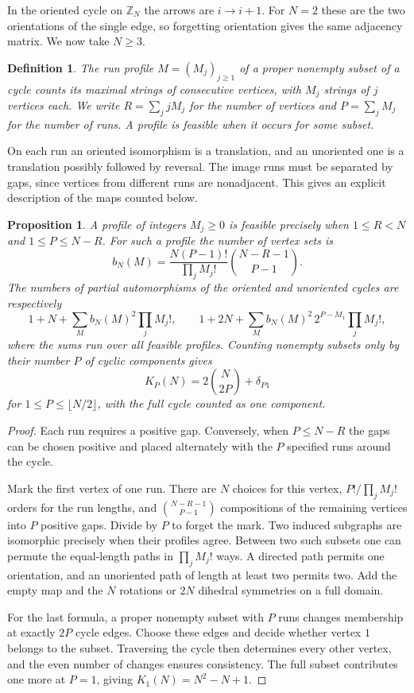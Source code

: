 \documentclass[11pt,a4paper]{article}
\newtheorem{prop}[thm]{Proposition}
\newtheorem{defn}[thm]{Definition}
\begin{document}
In the oriented cycle on $\mathbb Z_N$ the arrows are $i\to i+1$. For $N=2$ these are the two orientations of the single edge, so forgetting orientation gives the same adjacency matrix. We now take $N\geq3$.

\begin{samepage}
\begin{defn}
The run profile $M=(M_j)_{j\geq1}$ of a proper nonempty subset of a cycle counts its maximal strings of consecutive vertices, with $M_j$ strings of $j$ vertices each. We write $R=\sum_j jM_j$ for the number of vertices and $P=\sum_j M_j$ for the number of runs. A profile is feasible when it occurs for some subset.
\end{defn}
\end{samepage}

On each run an oriented isomorphism is a translation, and an unoriented one is a translation possibly followed by reversal. The image runs must be separated by gaps, since vertices from different runs are nonadjacent. This gives an explicit description of the maps counted below.

\begin{samepage}
\begin{prop}\label{cyclecount}
A profile of integers $M_j\geq0$ is feasible precisely when $1\leq R<N$ and $1\leq P\leq N-R$. For such a profile the number of vertex sets is
\[
 b_N(M)=\frac{N(P-1)!}{\prod_j M_j!}\binom{N-R-1}{P-1}.
\]
The numbers of partial automorphisms of the oriented and unoriented cycles are respectively
\[
 1+N+\sum_M b_N(M)^2\prod_j M_j!,
 \qquad
 1+2N+\sum_M b_N(M)^2\,2^{P-M_1}\prod_j M_j!,
\]
where the sums run over all feasible profiles. Counting nonempty subsets only by their number $P$ of cyclic components gives
\[
 K_P(N)=2\binom{N}{2P}+\delta_{P1}
\]
for $1\leq P\leq\lfloor N/2\rfloor$, with the full cycle counted as one component.
\end{prop}
\end{samepage}
\begin{proof}
Each run requires a positive gap. Conversely, when $P\leq N-R$ the gaps can be chosen positive and placed alternately with the $P$ specified runs around the cycle.

Mark the first vertex of one run. There are $N$ choices for this vertex, $P!/\prod_j M_j!$ orders for the run lengths, and $\binom{N-R-1}{P-1}$ compositions of the remaining vertices into $P$ positive gaps. Divide by $P$ to forget the mark. Two induced subgraphs are isomorphic precisely when their profiles agree. Between two such subsets one can permute the equal-length paths in $\prod_j M_j!$ ways. A directed path permits one orientation, and an unoriented path of length at least two permits two. Add the empty map and the $N$ rotations or $2N$ dihedral symmetries on a full domain.

For the last formula, a proper nonempty subset with $P$ runs changes membership at exactly $2P$ cycle edges. Choose these edges and decide whether vertex $1$ belongs to the subset. Traversing the cycle then determines every other vertex, and the even number of changes ensures consistency. The full subset contributes one more at $P=1$, giving $K_1(N)=N^2-N+1$.
\end{proof}
\end{document}
